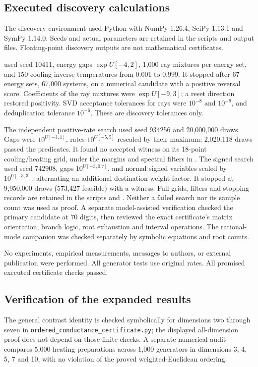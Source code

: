 \documentclass[11pt]{article}
\begin{document}
\subsection{Executed discovery calculations}
The discovery environment used Python with NumPy 1.26.4, SciPy 1.13.1 and SymPy 1.14.0. Seeds and actual parameters are retained in the scripts and output files. Floating-point discovery outputs are not mathematical certificates.

 used seed 10411, energy gaps $\exp U[-4,2]$, 1,000 ray mixtures per energy set, and 150 cooling inverse temperatures from 0.001 to 0.999. It stopped after 67 energy sets, 67,000 systems, on a numerical candidate with a positive reversal score. Coefficients of the ray mixtures were $\exp U[-9,3]$; a reset direction restored positivity. SVD acceptance tolerances for rays were $10^{-8}$ and $10^{-9}$, and deduplication tolerance $10^{-6}$. These are discovery tolerances only.

The independent positive-rate search used seed 934256 and 20,000,000 draws. Gaps were $10^{U[-3,1]}$, rates $10^{U[-5,5]}$ rescaled by their maximum; 2,020,118 draws passed the predicates. It found no accepted witness on its 18-point cooling/heating grid, under the margins and spectral filters in . The signed search used seed 742908, gaps $10^{U[-3,0.7]}$, and normal signed variables scaled by $10^{U[-3,3]}$, alternating an additional destination-weight factor. It stopped at 9,950,000 draws (573,427 feasible) with a witness. Full grids, filters and stopping records are retained in the scripts and . Neither a failed search nor its sample count was used as proof. A separate model-assisted verification checked the primary candidate at 70 digits, then reviewed the exact certificate's matrix orientation, branch logic, root exhaustion and interval operations. The rational-mode companion was checked separately by symbolic equations and root counts.

No experiments, empirical measurements, messages to authors, or external publication were performed. All generator tests use original rates. All promised executed certificate checks passed.

\subsection{Verification of the expanded results}
The general contrast identity is checked symbolically for dimensions two through seven in
\texttt{ordered\_conductance\_certificate.py}; the displayed all-dimension proof does not
depend on those finite checks. A separate numerical audit compares 5,000 heating
preparations across 1,000 generators in dimensions 3, 4, 5, 7 and 10, with no violation
of the proved weighted-Euclidean ordering.
\end{document}

